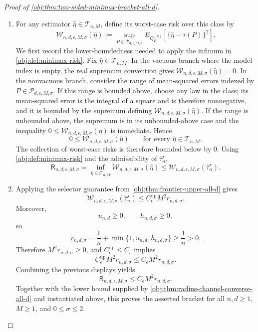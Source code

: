 \begin{proof}[Proof of \cref{obj:thm:two-sided-minimax-bracket-all-d}]
\begin{enumerate}
\item For any estimator \(\widehat\eta\in\mathcal T_{n,M}\), define its worst-case risk over
this class by
\[
\mathcal W_{n,d,\epsilon,M,\sigma}(\widehat\eta)
:=
\sup_{P\in\mathcal P_{d,\epsilon,M,\sigma}}
E_{Q_P^{(n)}}\!\left[\{\widehat\eta-\tau(P)\}^2\right].
\]
We first record the lower-boundedness needed to apply the infimum in
\cref{obj:def:minimax-risk}.  Fix \(\widehat\eta\in\mathcal T_{n,M}\).  In the vacuous branch
where the model index is empty, the real supremum convention gives
\(\mathcal W_{n,d,\epsilon,M,\sigma}(\widehat\eta)=0\).  In the nonvacuous branch, consider
the range of mean-squared errors indexed by \(P\in\mathcal P_{d,\epsilon,M,\sigma}\).  If
this range is bounded above, choose any law in the class; its mean-squared error is the
integral of a square and is therefore nonnegative, and it is bounded by the supremum defining
\(\mathcal W_{n,d,\epsilon,M,\sigma}(\widehat\eta)\).  If the range is unbounded above, the
supremum is in its unbounded-above case and the inequality
\(0\le\mathcal W_{n,d,\epsilon,M,\sigma}(\widehat\eta)\) is immediate.  Hence
\[
0\le\mathcal W_{n,d,\epsilon,M,\sigma}(\widehat\eta)
\qquad\text{for every }\widehat\eta\in\mathcal T_{n,M}.
\]
The collection of worst-case risks is therefore bounded below by \(0\).  Using
\cref{obj:def:minimax-risk} and the admissibility of \(\widehat\tau_n^{\star}\),
\[
\mathsf R_{n,d,\epsilon,M,\sigma}
=
\inf_{\widehat\eta\in\mathcal T_{n,M}}
\mathcal W_{n,d,\epsilon,M,\sigma}(\widehat\eta)
\le
\mathcal W_{n,d,\epsilon,M,\sigma}(\widehat\tau_n^{\star}).
\] %

\item Applying the selector guarantee from \cref{obj:thm:frontier-upper-all-d} gives
\[
\mathcal W_{n,d,\epsilon,M,\sigma}(\widehat\tau_n^{\star})
\le
C_{\epsilon}^{\mathrm{up}}M^2 r_{n,d,\sigma}.
\]
Moreover,
\[
u_{n,d}\ge0,\qquad h_{n,d,\sigma}\ge0,
\]
so
\[
r_{n,d,\sigma}
=
\frac1n+\min\{1,u_{n,d},h_{n,d,\sigma}\}
\ge
\frac1n
>
0.
\]
Therefore \(M^2r_{n,d,\sigma}\ge0\), and \(C_{\epsilon}^{\mathrm{up}}\le C_{\epsilon}\)
implies
\[
C_{\epsilon}^{\mathrm{up}}M^2 r_{n,d,\sigma}
\le
C_{\epsilon}M^2 r_{n,d,\sigma}.
\]
Combining the previous displays yields
\[
\mathsf R_{n,d,\epsilon,M,\sigma}
\le
C_{\epsilon}M^2 r_{n,d,\sigma}.
\]
Together with the lower bound supplied by \cref{obj:thm:radius-channel-converse-all-d} and
instantiated above, this proves the asserted bracket for all \(n,d\ge1\), \(M\ge1\), and
\(0\le\sigma\le2\). %
\end{enumerate}
\end{proof}

